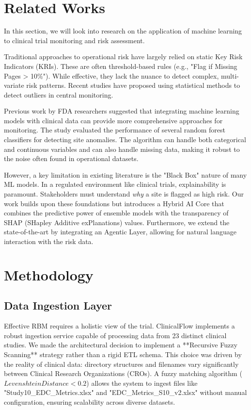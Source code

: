 \documentclass[conference]{IEEEtran}
\begin{document}
\section{Related Works}
In this section, we will look into research on the application of machine learning to clinical trial monitoring and risk assessment.

Traditional approaches to operational risk have largely relied on static Key Risk Indicators (KRIs). These are often threshold-based rules (e.g., "Flag if Missing Pages > 10\%"). While effective, they lack the nuance to detect complex, multi-variate risk patterns. Recent studies have proposed using statistical methods to detect outliers in central monitoring.

Previous work by FDA researchers suggested that integrating machine learning models with clinical data can provide more comprehensive approaches for monitoring. The study evaluated the performance of several random forest classifiers for detecting site anomalies. The algorithm can handle both categorical and continuous variables and can also handle missing data, making it robust to the noise often found in operational datasets.

However, a key limitation in existing literature is the "Black Box" nature of many ML models. In a regulated environment like clinical trials, explainability is paramount. Stakeholders must understand \textit{why} a site is flagged as high risk. Our work builds upon these foundations but introduces a Hybrid AI Core that combines the predictive power of ensemble models with the transparency of SHAP (SHapley Additive exPlanations) values. Furthermore, we extend the state-of-the-art by integrating an Agentic Layer, allowing for natural language interaction with the risk data.

\section{Methodology}

\subsection{\textbf{Data Ingestion Layer}}
Effective RBM requires a holistic view of the trial. ClinicalFlow implements a robust ingestion service capable of processing data from 23 distinct clinical studies. We made the architectural decision to implement a **Recursive Fuzzy Scanning** strategy rather than a rigid ETL schema. 
This choice was driven by the reality of clinical data: directory structures and filenames vary significantly between Clinical Research Organizations (CROs). A fuzzy matching algorithm ($Levenshtein Distance < 0.2$) allows the system to ingest files like "Study10\_EDC\_Metrics.xlsx" and "EDC\_Metrics\_S10\_v2.xlsx" without manual configuration, ensuring scalability across diverse datasets.
\end{document}
